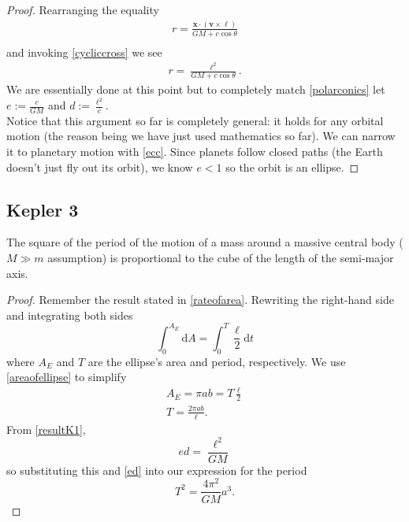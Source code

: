 \begin{proof}
Rearranging the equality 
\begin{align}
    r = \frac{\bm{x} \cdot \left(\bm{v} \times \bm{\ell}\right)}{GM + c\cos\theta} \\
\end{align}
and invoking \ref{cycliccross} we see 
\begin{align}\label{resultK1}
    r = \frac{\ell^2}{GM + c\cos\theta}.
\end{align}
We are essentially done at this point but to completely match \ref{polarconics} let $e := \frac{c}{GM}$ and $d := \frac{\ell^2}{c}$. \\
Notice that this argument so far is completely general: it holds for any orbital motion (the reason being we have just used mathematics so far). We can narrow it to planetary motion with \ref{ecc}. Since planets follow closed paths (the Earth doesn't just fly out its orbit), we know $e < 1$ so the orbit is an ellipse.
\end{proof}
\subsection{Kepler 3}\label{subsection-K3}
\begin{theorem}
The square of the period of the motion of a mass around a massive central body ($M \gg m$ assumption) is proportional to the cube of the length of the semi-major axis. 
\end{theorem}
\begin{proof}
Remember the result stated in \ref{rateofarea}. Rewriting the right-hand side and integrating both sides
\begin{equation}
    \int_{0}^{A_E} \mathrm{d}A = \int_{0}^{T}\frac{\ell}{2}\mathrm{d}t
\end{equation}
where $A_E$ and $T$ are the ellipse's area and period, respectively. We use \ref{areaofellipse} to simplify
\begin{align}
    A_E = \pi ab = T\frac{\ell}{2} \\
    T = \frac{2\pi ab}{\ell}.
\end{align}
From \ref{resultK1}, 
\begin{equation}
    ed = \frac{\ell^2}{GM}
\end{equation}
so substituting this and \ref{ed} into our expression for the period
\begin{equation}
    T^2 = \frac{4\pi^2}{GM}a^3.
\end{equation}

\end{proof}
